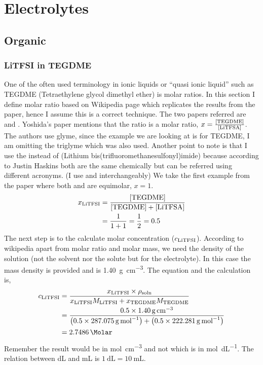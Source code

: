 \documentclass[12pt]{book}
\begin{document}
\chapter{Electrolytes}
\section{Organic}
\subsection{LiTFSI in TEGDME}
One of the often used terminology in ionic liquids or ``quasi ionic liquid'' such as TEGDME (Tetraethylene glycol dimethyl ether) is molar ratios. In this section I define molar ratio based on Wikipedia page which replicates the results from the paper, hence I assume this is a correct technique. 
The two papers referred are \cite{Hayamizu2002} and \cite{Yoshida2011}.
Yoshida's paper mentions that the ratio is a molar ratio, $x=\frac{[\ce{TEGDME}]}{[\ce{LiTFSA}]}$. The authors use glyme, since the example we are looking at is for TEGDME, I am omitting the triglyme which was also used.  Another point to note is that I use the  instead of  (Lithium bis(trifluoromethanesulfonyl)imide) because according to Justin Haskins both are the same chemically but can be referred using different acronyms. (I use  and  interchangeably)
We take the first example from the paper where both  and  are equimolar, $x=1$. 
\begin{align}
	x_{\ce{LiTFSI}} &= \frac{[\ce{TEGDME}]}{[\ce{TEGDME}]+[\ce{LiTFSA}]}\\
	               &= \frac{1}{1+1}= \frac{1}{2}= 0.5
\end{align}
The next step is to the calculate molar concentration ($c_{\ce{LiTFSI}}$).
According to wikipedia apart from molar ratio and molar mass, we need the density of the solution (not the solvent nor the solute but for the electrolyte). In this case the mass density is provided and is \SI{1.40}{\gram\per\centi\meter\cubed}. The equation and the calculation is,
\begin{align}
c_{\ce{LiTFSI}}&=\frac{x_{\ce{LiTFSI}}\times\rho_{\textrm{soln}}}{x_{\ce{LiTFSI}}M_{\ce{LiTFSI}}+x_{\ce{TEGDME}}M_{\ce{TEGDME}}}\nonumber\\
&=\frac{\num{0.5}\times\SI{1.40}{\gram\per\centi\meter\cubed}}{\left(\num{0.5}\times\SI{287.075}{\gram\per\mole}\right)+\left(\num{0.5}\times\SI{222.281}{\gram\per\mole}\right)}\nonumber\\
&=\SI{2.7486}{\Molar}
\end{align}
Remember the result would be in \si{\mole\per\centi\meter\cubed} and not \si{\Molar} which is in \si{\mole\per\deci\liter}. The relation between \si{\deci\liter} and \si{\milli\liter} is $\SI{1}{\deci\liter}=\SI{10}{\milli\liter}$.
\end{document}
